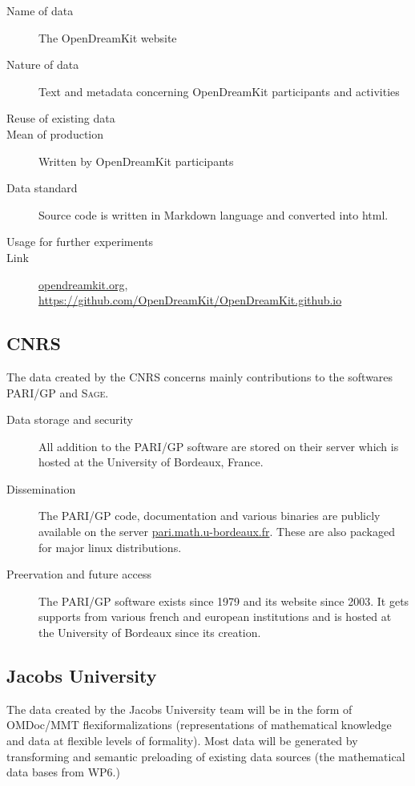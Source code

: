 \documentclass[12pt]{article}
\newcommand{\software}[1]{\textsc{#1}\xspace}
\newcommand{\Sage}{\software{Sage}}
\newcommand{\PARIGP}{\software{PARI/GP}}
\begin{document}
\begin{enumerate}
\begin{description}
\item[Name of data] The OpenDreamKit website
\item[Nature of data] Text and metadata concerning OpenDreamKit participants and activities
\item[Reuse of existing data]
\item[Mean of production] Written by OpenDreamKit participants
\item[Data standard] Source code is written in Markdown language and converted into html.
\item [Usage for further experiments]
\item [Link] \href{http://opendreamkit.org/}{opendreamkit.org}, \href{https://github.com/OpenDreamKit/OpenDreamKit.github.io}{https://github.com/OpenDreamKit/OpenDreamKit.github.io}
\end{description}

\end{enumerate}

\subsection{CNRS}

The data created by the CNRS concerns mainly contributions to the softwares \PARIGP and \Sage.
\begin{description}
\item[Data storage and security] All addition to the \PARIGP software are stored on their server which is hosted at the University of Bordeaux, France.
\item[Dissemination] The \PARIGP code, documentation and various binaries are publicly available on the server \href{http://pari.math.u-bordeaux.fr/}{pari.math.u-bordeaux.fr}. These are also packaged for major linux distributions.
\item[Preervation and future access] The \PARIGP software exists since 1979 and its website since 2003. It gets supports from various french and european institutions and is hosted at the University of Bordeaux since its creation.
\end{description}


\subsection{Jacobs University}

The data created by the Jacobs University team will be in the form of OMDoc/MMT
flexiformalizations (representations of mathematical knowledge and data at flexible levels
of formality). Most data will be generated by transforming and semantic preloading of
existing data sources (the mathematical data bases from WP6.)
\end{document}
